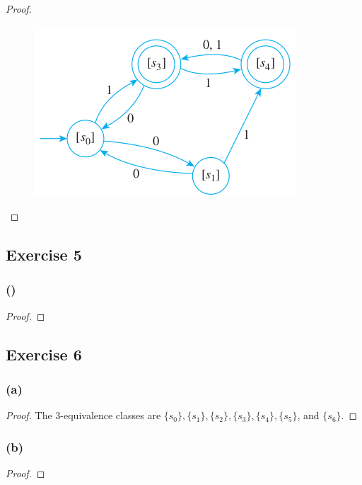 \documentclass[14pt]{extarticle}
\begin{document}
\begin{proof}
\begin{figure}[ht!]
\centering
\includegraphics[scale=0.5]{../images/12.3.4.b.png}
\end{figure}
\end{proof}

\subsection{Exercise 5}

\subsubsection{()}

\begin{proof}

\end{proof}

\subsection{Exercise 6}

\subsubsection{(a)}

\begin{proof}
The 3-equivalence classes are \(\{s_0\}, \{s_1\}, \{s_2\}, \{s_3\}, \{s_4\}, \{s_5\}\), and \(\{s_6\}\).
\end{proof}

\subsubsection{(b)}

\begin{proof}

\end{proof}
\end{document}
